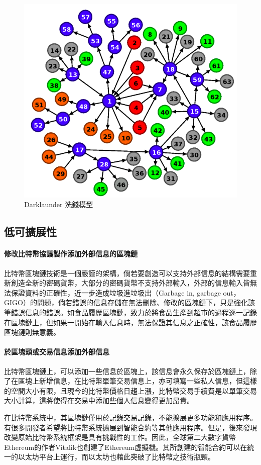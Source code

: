 			\begin{figure}[h]
				\centering
				\includegraphics[width = .7\textwidth]{Darklaunderworkflow.png}
				\caption{Darklaunder 洗錢模型\supercite{AnAnalysisofBitcoinLaundryServices}}\label{Darklaunderworkflow}
			\end{figure}

		\subsection{低可擴展性}

			\paragraph{修改比特幣協議製作添加外部信息的區塊鏈}比特幣區塊鏈技術是一個嚴謹的架構，倘若要創造可以支持外部信息的結構需要重新創造全新的密碼貨幣，大部分的密碼貨幣不支持外部輸入，外部的信息輸入皆無法保證資料的正確性，近一步造成垃圾進垃圾出（Garbage in, garbage out，GIGO）的問題，倘若錯誤的信息存儲在無法刪除、修改的區塊鏈下，只是強化該筆錯誤信息的錯誤。如食品履歷區塊鏈，致力於將食品生產到超市的過程逐一記錄在區塊鏈上，但如果一開始在輸入信息時，無法保證其信息之正確性，該食品履歷區塊鏈則無意義。
			\paragraph{於區塊頭或交易信息添加外部信息} 比特幣區塊鏈上，可以添加一些信息於區塊上，該信息會永久保存於區塊鏈上，除了在區塊上新增信息，在比特幣單筆交易信息上，亦可填寫一些私人信息，但這樣的空間大小有限，且現今的比特幣價格日趨上漲，比特幣交易手續費是以單筆交易大小計算，這將使得在交易中添加些個人信息變得更加昂貴。

		在比特幣系統中，其區塊鏈僅用於記錄交易記錄，不能擴展更多功能和應用程序。有很多開發者希望將比特幣系統擴展到智能合約等其他應用程序。但是，後來發現改變原始比特幣系統框架是具有挑戰性的工作。因此，全球第二大數字貨幣Ethereum的作者Vitalik也創建了Ethereum虛擬機。其所創建的智能合約可以在統一的以太坊平台上運行，而以太坊也藉此突破了比特幣之技術瓶頸。